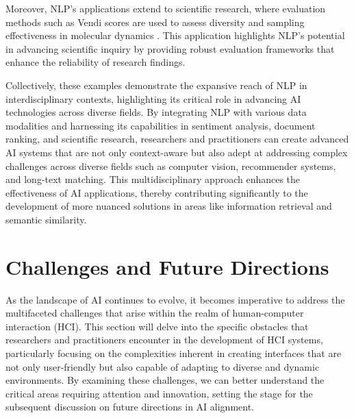 Moreover, NLP's applications extend to scientific research, where evaluation methods such as Vendi scores are used to assess diversity and sampling effectiveness in molecular dynamics \cite{pasarkar2024cousinsvendiscorefamily}. This application highlights NLP's potential in advancing scientific inquiry by providing robust evaluation frameworks that enhance the reliability of research findings.



Collectively, these examples demonstrate the expansive reach of NLP in interdisciplinary contexts, highlighting its critical role in advancing AI technologies across diverse fields. By integrating NLP with various data modalities and harnessing its capabilities in sentiment analysis, document ranking, and scientific research, researchers and practitioners can create advanced AI systems that are not only context-aware but also adept at addressing complex challenges across diverse fields such as computer vision, recommender systems, and long-text matching. This multidisciplinary approach enhances the effectiveness of AI applications, thereby contributing significantly to the development of more nuanced solutions in areas like information retrieval and semantic similarity. \cite{ginzburg2021selfsuperviseddocumentsimilarityranking}













\section{Challenges and Future Directions} \label{sec:Challenges and Future Directions}

As the landscape of AI continues to evolve, it becomes imperative to address the multifaceted challenges that arise within the realm of human-computer interaction (HCI). This section will delve into the specific obstacles that researchers and practitioners encounter in the development of HCI systems, particularly focusing on the complexities inherent in creating interfaces that are not only user-friendly but also capable of adapting to diverse and dynamic environments. By examining these challenges, we can better understand the critical areas requiring attention and innovation, setting the stage for the subsequent discussion on future directions in AI alignment. 






